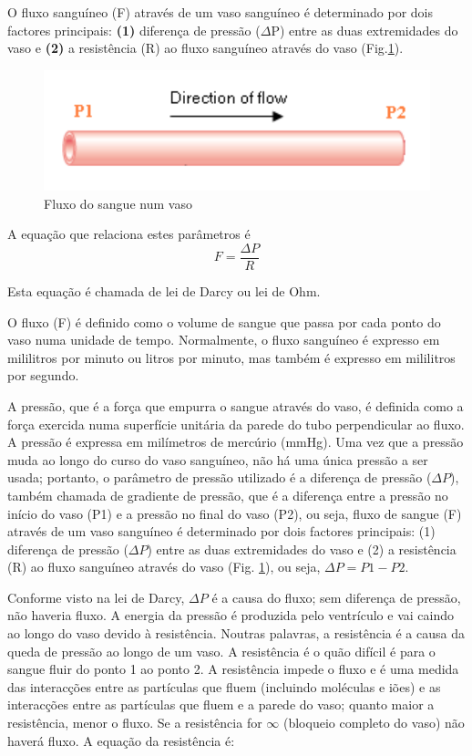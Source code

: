 \documentclass[
  portuguese,
  ]{book}
\begin{document}
O fluxo sanguíneo (F) através de um vaso sanguíneo é determinado por dois factores principais: \textbf{(1)} diferença de pressão (\(\Delta\)P) entre as duas extremidades do vaso e \textbf{(2)} a resistência (R) ao fluxo sanguíneo através do vaso (Fig.\ref{fig:imghemo1}).

\begin{figure}

{\centering \includegraphics[width=0.5\linewidth]{img/hemo_1} 

}

\caption{Fluxo do sangue num vaso}\label{fig:imghemo1}
\end{figure}

A equação que relaciona estes parâmetros é
\begin{equation}
F=\frac{\Delta P}{R}
\label{eq:darcy}
\end{equation}

Esta equação é chamada de lei de Darcy ou lei de Ohm.

O fluxo (F) é definido como o volume de sangue que passa por cada ponto do vaso numa unidade de tempo. Normalmente, o fluxo sanguíneo é expresso em mililitros por minuto ou litros por minuto, mas também é expresso em mililitros por segundo.

A pressão, que é a força que empurra o sangue através do vaso, é definida como a força exercida numa superfície unitária da parede do tubo perpendicular ao fluxo. A pressão é expressa em milímetros de mercúrio (mmHg). Uma vez que a pressão muda ao longo do curso do vaso sanguíneo, não há uma única pressão a ser usada; portanto, o parâmetro de pressão utilizado é a diferença de pressão (\(\Delta P\)), também chamada de gradiente de pressão, que é a diferença entre a pressão no início do vaso (P1) e a pressão no final do vaso (P2), ou seja, fluxo de sangue (F) através de um vaso sanguíneo é determinado por dois factores principais: (1) diferença de pressão (\(\Delta P\)) entre as duas extremidades do vaso e (2) a resistência (R) ao fluxo sanguíneo através do vaso (Fig. \ref{fig:imghemo1}), ou seja, \(\Delta P = P1 - P2\).

Conforme visto na lei de Darcy, \(\Delta P\) é a causa do fluxo; sem diferença de pressão, não haveria fluxo. A energia da pressão é produzida pelo ventrículo e vai caindo ao longo do vaso devido à resistência. Noutras palavras, a resistência é a causa da queda de pressão ao longo de um vaso.
A resistência é o quão difícil é para o sangue fluir do ponto 1 ao ponto 2. A resistência impede o fluxo e é uma medida das interacções entre as partículas que fluem (incluindo moléculas e iões) e as interacções entre as partículas que fluem e a parede do vaso; quanto maior a resistência, menor o fluxo. Se a resistência for \(\infty\) (bloqueio completo do vaso) não haverá fluxo. A equação da resistência é:
\end{document}
